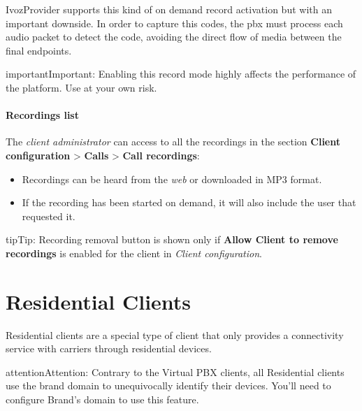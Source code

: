 \documentclass[letterpaper,10pt,english]{sphinxmanual}
\begin{document}
IvozProvider supports this kind of on demand record activation but with an
important downside. In order to capture this codes, the pbx must process each
audio packet to detect the code, avoiding the direct flow of media between the
final endpoints.

\begin{notice}{important}{Important:}
Enabling this record mode highly affects the performance of the
platform. Use at your own risk.
\end{notice}


\paragraph{Recordings list}
\label{administration_portal/client/vpbx/calls/call_recordings:recordings-list}
The \emph{client administrator} can access to all the recordings in the section
\textbf{Client configuration} \textgreater{} \textbf{Calls} \textgreater{} \textbf{Call recordings}:
\begin{itemize}
\item {} 
Recordings can be heard from the \emph{web} or downloaded in MP3 format.

\item {} 
If the recording has been started on demand, it will also include the user
that requested it.

\end{itemize}

\begin{notice}{tip}{Tip:}
Recording removal button is shown only if \textbf{Allow Client to remove recordings} is enabled
for the client in \emph{Client configuration}.
\end{notice}
\label{administration_portal/client/residential/index:residential-clients}

\section{Residential Clients}
\label{administration_portal/client/residential/index:residential-clients}\label{administration_portal/client/residential/index:id1}\label{administration_portal/client/residential/index::doc}\label{administration_portal/client/residential/index:clientes-residenciales}
Residential clients are a special type of client that only provides a connectivity
service with carriers through residential devices.

\begin{notice}{attention}{Attention:}
Contrary to the Virtual PBX clients, all Residential clients use the
brand domain to unequivocally identify their devices. You'll need to configure
Brand's domain to use this feature.
\end{notice}
\end{document}

